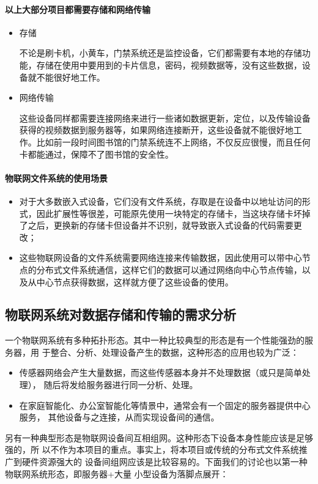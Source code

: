 \documentclass{ctexart}
\begin{document}
\paragraph{以上大部分项目都需要存储和网络传输}
\begin{itemize}
	\item 存储

	不论是刷卡机，小黄车，门禁系统还是监控设备，它们都需要有本地的存储功能，存储在使用中要用到的卡片信息，密码，视频数据等，没有这些数据，设备就不能很好地工作。
	\item 网络传输

	这些设备同样都需要连接网络来进行一些诸如数据更新，定位，以及传输设备获得的视频数据到服务器等，如果网络连接断开，这些设备就不能很好地工作。比如前一段时间图书馆的门禁系统连不上网络，不仅反应很慢，而且任何卡都能通过，保障不了图书馆的安全性。
\end{itemize}
\paragraph{物联网文件系统的使用场景}
\begin{itemize}
	\item 对于大多数嵌入式设备，它们没有文件系统，存取是在设备中以地址访问的形式，因此扩展性等很差，可能原先使用一块特定的存储卡，当这块存储卡坏掉了之后，更换新的存储卡但设备并不识别，就导致嵌入式设备的代码需要更改；
	\item 这些物联网设备的文件系统需要网络连接来传输数据，因此使用可以带中心节点的分布式文件系统通信，这样它们的数据可以通过网络向中心节点传输，以及从中心节点获得数据，这样就方便了这些设备的使用。
\end{itemize}
\subsection{物联网系统对数据存储和传输的需求分析}

一个物联网系统有多种拓扑形态。其中一种比较典型的形态是有一个性能强劲的服务器，用
于整合、分析、处理设备产生的数据，这种形态的应用也较为广泛：
\begin{itemize}
\item 传感器网络会产生大量数据，而这些传感器本身并不处理数据（或只是简单处理），
  随后将发给服务器进行同一分析、处理。
\item 在家庭智能化、办公室智能化等情景中，通常会有一个固定的服务器提供中心服务，
  其他设备与之连接，从而实现设备间的通信。
\end{itemize}

另有一种典型形态是物联网设备间互相组网。这种形态下设备本身性能应该是足够强的，所
以不作为本项目的重点。事实上，将本项目或传统的分布式文件系统推广到硬件资源强大的
设备间组网应该是比较容易的。下面我们的讨论也以第一种物联网系统形态，即服务器+大量
小型设备为落脚点展开：
\end{document}
